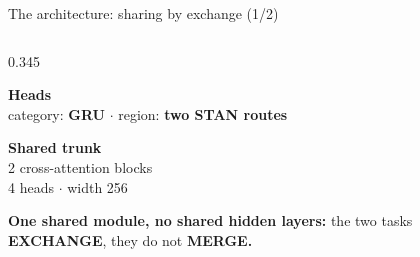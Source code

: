 \documentclass{beamer}
\begin{document}
\begin{frame}{The architecture: sharing by exchange (1/2)}
\begin{columns}[T,onlytextwidth]
\begin{column}{0.345\textwidth}
{            %
            \textbf{Heads}\\
            category: \textbf{GRU} $\cdot$ region: \textbf{two STAN routes}
            \par\vspace{4mm}
            \textbf{Shared trunk}\\
            2 cross-attention blocks\\
            4 heads $\cdot$ width 256
            \par\vspace{5mm}
            \alert{\textbf{One shared module, no shared hidden layers:}
            the two tasks \textbf{EXCHANGE}, they do not \textbf{MERGE.}}\par}
        \end{column}
    \end{columns}

\end{frame}
\end{document}
